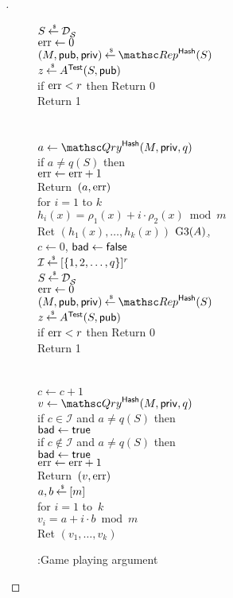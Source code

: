 \begin{proof}[]
\begin{figure}
{{$S {\:\stackrel{{\scriptscriptstyle \hspace{0.2em}\$}} {\leftarrow}\:} \mathcal{D}_{{\cal S}}^{}$\\
$\mathrm{err} \gets 0$\\
$(M,\pubaux,\privaux) \getsr \Rep^{\HashOracle}(S)$\\
$z {\:\stackrel{{\scriptscriptstyle \hspace{0.2em}\$}} {\leftarrow}\:} A^{\mathsf{Test}}(S,{\sf pub})$\\
if $\mathrm{err}  < r$ then Return 0\\
Return 1\\\\
%
\\
$a \gets \Qry^{\HashOracle}(M,\privaux,q)$\\
if $a \neq q(S)$ then \\
\nudge $\mathrm{err} \gets\mathrm{err} +1$\\
Return~$(a,\mathrm{err} )$
%
\\
for $i=1$ to $k$\\
\nudge $h_i(x) = \rho_1(x)+i \cdot \rho_2(x) \bmod m$\\
Ret $\left(h_1(x),\ldots,h_k(x)\right)$
}
{
\underline{{$\text{G3}(A)$},}\\
$c\gets 0$, $\mathsf{bad} \gets \mathsf{false}$\\
$\mathcal{I}{\:\stackrel{{\scriptscriptstyle \hspace{0.2em}\$}} {\leftarrow}\:} [\{1,2,\ldots,q\}]^r$\\
$S {\:\stackrel{{\scriptscriptstyle \hspace{0.2em}\$}} {\leftarrow}\:} \mathcal{D}_{{\cal S}}^{}$\\
$\mathrm{err} \gets 0$\\
$(M,\pubaux,\privaux) \getsr \Rep^{\HashOracle}(S)$\\
$z {\:\stackrel{{\scriptscriptstyle \hspace{0.2em}\$}} {\leftarrow}\:} A^{\mathsf{Test}}(S,{\sf pub})$\\
if $\mathrm{err}  < r$ then Return 0\\
Return 1\\\\
%
\\
$c \gets c+1$\\
$v \gets \Qry^{\HashOracle}(M,\privaux,q)$\\
if $c \in \mathcal{I}$ and $a \neq q(S)$ then \\
\nudge $\mathsf{bad} \gets \mathsf{true}$ \\
if $c \not\in \mathcal{I}$ and $a \neq q(S)$ then \\
\nudge $\mathsf{bad} \gets \mathsf{true}$\\
\nudge $\mathrm{err} \gets\mathrm{err} +1$\\
Return~$(v,\mathrm{err} )$
%
\\
$a,b {\:\stackrel{{\scriptscriptstyle \hspace{0.2em}\$}} {\leftarrow}\:} [m]$\\
for $i = 1$ to~$k$\\
\nudge $v_i = a+i \cdot b \bmod m$\\
Ret $\left(v_1,\ldots,v_k\right)$
}
}
\caption{:Game playing argument}\label{fig:Game}
\end{figure}



\end{proof}
